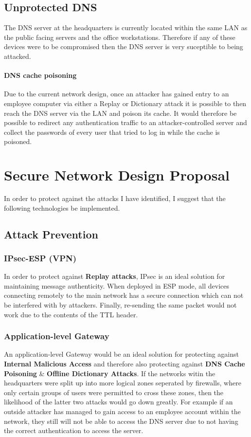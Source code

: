 \documentclass[11pt]{article}
\begin{document}
    \subsection{Unprotected DNS}
      The DNS server at the headquarters is currently located within the same LAN as the public facing servers and the office workstations. Therefore if any of these devices were to be compromised then the DNS server is very suceptible to being attacked.

      \paragraph{DNS cache poisoning}
        Due to the current network design, once an attacker has gained entry to an employee computer via either a Replay or Dictionary attack it is possible to then reach the DNS server via the LAN and poison its cache. It would therefore be possible to redirect any authentication traffic to an attacker-controlled server and collect the passwords of every user that tried to log in while the cache is poisoned.

    \section{Secure Network Design Proposal}
      In order to protect against the attacks I have identified, I suggest that the following technologies be implemented.

      \subsection{Attack Prevention}
        \subsubsection{IPsec-ESP (VPN)}
          In order to protect against \textbf{Replay attacks}, IPsec is an ideal solution for maintaining message authenticity. When deployed in ESP mode, all devices connecting remotely to the main network has a secure connection which can not be interfered with by attackers. Finally, re-sending the same packet would not work due to the contents of the TTL header.

        \subsubsection{Application-level Gateway}
          An application-level Gateway would be an ideal solution for protecting against \textbf{Internal Malicious Access} and therefore also protecting against \textbf{DNS Cache Poisoning} \& \textbf{Offline Dictionary Attacks}. If the networks witin the headquarters were split up into more logical zones seperated by firewalls, where only certain groups of users were permitted to cross these zones, then the likelihood of the latter two attacks would go down greatly. For example if an outside attacker has managed to gain access to an employee account within the network, they still will not be able to access the DNS server due to not having the correct authentication to access the server.
\end{document}
